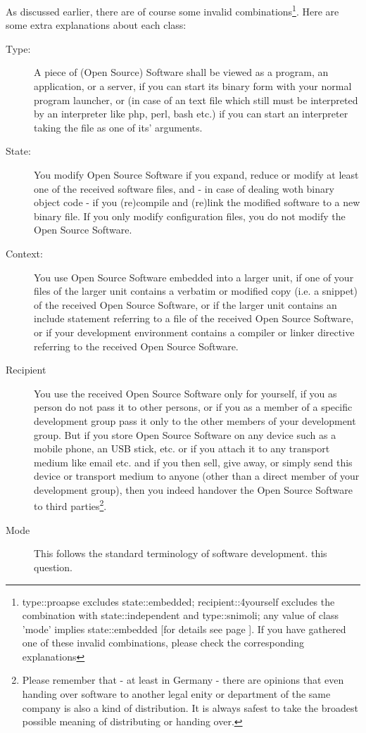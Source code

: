 As discussed earlier, there are of course some invalid
combinations\footnote{type::proapse excludes state::embedded;
recipient::4yourself excludes the combination with state::independent and
type::snimoli; any value of class 'mode' implies state::embedded [for details
see page \pageref{InvalidFinderTokenCombinations}]. If you have gathered one of
these invalid combinations, please check the corresponding explanations}. Here
are some extra explanations about each class:

\begin{description}
\item[Type:] A piece of (Open Source) Software shall be viewed as a program, an
application, or a server, if you can start its binary form with your normal
program launcher, or (in case of an text file which still must be interpreted by
an interpreter like php, perl, bash etc.) if you can start an interpreter taking
the file as one of its' arguments. \item[State:] You modify Open Source Software
if you expand, reduce or modify at least one of the received software files, and
- in case of dealing woth binary object code - if you (re)compile and (re)link
the modified software to a new binary file. If you only modify configuration
files, you do not modify the Open Source Software.
\item[Context:] You use Open Source Software embedded into a larger unit, if one
of your files of the larger unit contains a verbatim or modified copy (i.e. a
snippet) of the received Open Source Software, or if the larger unit contains an
include statement referring to a file of the received Open Source Software, or
if your development environment contains a compiler or linker directive
referring to the received Open Source Software.
\item[Recipient] You use the received Open Source Software only for yourself, if
you as person do not pass it to other persons, or if you as a member of a
specific development group pass it only to the other members of your
development group. But if you store Open Source Software on any device such as a
mobile phone, an USB stick, etc. or if you attach it to any transport
medium like email etc. and if you then sell, give away, or simply send this
device or transport medium to anyone (other than a direct member
of your development group), then you indeed handover the Open Source Software to
third parties\footnote{Please remember that - at least in Germany - there are
opinions that even handing over software to another legal enity or department
of the same company is also a kind of distribution. It is always safest
to take the broadest possible meaning of distributing or handing over.}.
\item[Mode] This follows the standard terminology of software development.
this question.
\end{description}


